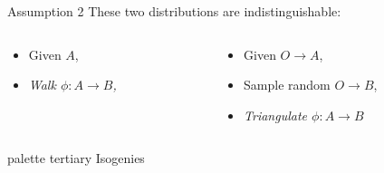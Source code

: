 \documentclass[aspectratio=169]{beamer}
\begin{document}

\begin{frame}{Assumption 2}
  These two distributions are indistinguishable:

  \vfill

  \begin{columns}
    \begin{column}{0.5\textwidth}
      \begin{itemize}
      \item Given $A$,
      \item \emph{\textit{Walk} $\phi : A \to B$,}
      \end{itemize}
    \end{column}
    \begin{column}{0.5\textwidth}
      \begin{itemize}
      \item Given $O \to A$,
      \item Sample random $O \to B$,
      \item \emph{\textit{Triangulate} $\phi : A \to B$} 
      \end{itemize}
    \end{column}
  \end{columns}
\end{frame}


\begin{frame}[plain]
  \begin{beamercolorbox}[sep=0.1px,center,wd=\paperwidth,sep=0.5\paperheight]{palette tertiary}
    \Huge\centering Isogenies
  \end{beamercolorbox}
\end{frame}

\end{document}
